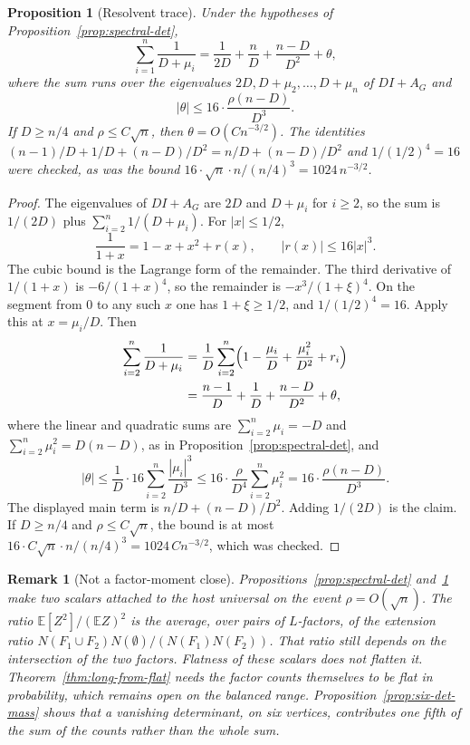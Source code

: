 \documentclass[11pt]{article}
\newtheorem{proposition}[theorem]{Proposition}
\newtheorem{remark}[theorem]{Remark}
\newcommand{\EE}{\mathbb{E}}
\begin{document}
\begin{proposition}[Resolvent trace]
\label{prop:resolvent-trace}
Under the hypotheses of Proposition~\ref{prop:spectral-det},
\[
\sum_{i=1}^n\frac{1}{D+\mu_i}
=
\frac{1}{2D}+\frac{n}{D}+\frac{n-D}{D^2}+\theta,
\]
where the sum runs over the eigenvalues \(2D,D+\mu_2,\ldots,D+\mu_n\) of
\(DI+A_G\) and
\[
|\theta|
\le
16\cdot\frac{\rho(n-D)}{D^3}.
\]
If \(D\ge n/4\) and \(\rho\le C\sqrt{n}\), then \(\theta=O(C n^{-3/2})\).
The identities \((n-1)/D+1/D+(n-D)/D^2=n/D+(n-D)/D^2\) and
\(1/(1/2)^4=16\) were checked, as was the bound
\(16\cdot\sqrt{n}\cdot n/(n/4)^3=1024\,n^{-3/2}\).
\end{proposition}

\begin{proof}
The eigenvalues of \(DI+A_G\) are \(2D\) and \(D+\mu_i\) for \(i\ge 2\), so the
sum is \(1/(2D)\) plus \(\sum_{i=2}^n 1/(D+\mu_i)\).
For \(|x|\le 1/2\),
\[
\frac{1}{1+x}=1-x+x^2+r(x),
\qquad
|r(x)|\le 16|x|^3.
\]
The cubic bound is the Lagrange form of the remainder.
The third derivative of \(1/(1+x)\) is \(-6/(1+x)^4\), so the remainder is
\(-x^3/(1+\xi)^4\).
On the segment from \(0\) to any such \(x\) one has \(1+\xi\ge 1/2\), and
\(1/(1/2)^4=16\).
Apply this at \(x=\mu_i/D\). Then
\begin{align*}
\sum_{i=2}^n\frac{1}{D+\mu_i}
&=
\frac1D\sum_{i=2}^n\Bigl(1-\frac{\mu_i}{D}+\frac{\mu_i^2}{D^2}+r_i\Bigr)\\
&=
\frac{n-1}{D}+\frac1D+\frac{n-D}{D^2}+\theta,
\end{align*}
where the linear and quadratic sums are \(\sum_{i=2}^n\mu_i=-D\) and
\(\sum_{i=2}^n\mu_i^2=D(n-D)\), as in Proposition~\ref{prop:spectral-det}, and
\[
|\theta|
\le
\frac1D\cdot 16\sum_{i=2}^n\frac{|\mu_i|^3}{D^3}
\le
16\cdot\frac{\rho}{D^4}\sum_{i=2}^n\mu_i^2
=
16\cdot\frac{\rho(n-D)}{D^3}.
\]
The displayed main term is \(n/D+(n-D)/D^2\).
Adding \(1/(2D)\) is the claim.
If \(D\ge n/4\) and \(\rho\le C\sqrt{n}\), the bound is at most
\(16\cdot C\sqrt{n}\cdot n/(n/4)^3=1024\,C n^{-3/2}\), which was checked.
\end{proof}

\begin{remark}[Not a factor-moment close]
\label{rem:spectral-not-moment}
Propositions~\ref{prop:spectral-det} and~\ref{prop:resolvent-trace} make two
scalars attached to the host universal on the event \(\rho=O(\sqrt{n})\).
The ratio \(\EE[Z^2]/(\EE Z)^2\) is the average, over pairs of \(L\)-factors, of
the extension ratio \(N(F_1\cup F_2)N(\emptyset)/(N(F_1)N(F_2))\).
That ratio still depends on the intersection of the two factors.
Flatness of these scalars does not flatten it.
Theorem~\ref{thm:long-from-flat} needs the factor counts themselves to be flat
in probability, which remains open on the balanced range.
Proposition~\ref{prop:six-det-mass} shows that a vanishing determinant, on six
vertices, contributes one fifth of the sum of the counts rather than the whole
sum.
\end{remark}
\end{document}
